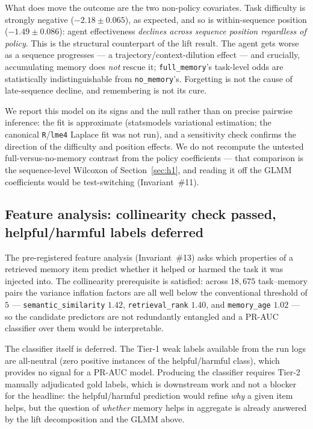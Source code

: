 What does move the outcome are the two non-policy covariates. Task difficulty is strongly
negative ($-2.18 \pm 0.065$), as expected, and so is within-sequence position
($-1.49 \pm 0.086$): agent effectiveness \emph{declines across sequence position regardless
of policy}. This is the structural counterpart of the lift result. The agent gets worse as a
sequence progresses --- a trajectory/context-dilution effect --- and crucially, accumulating
memory does \emph{not} rescue it; \texttt{full\_memory}'s task-level odds are statistically
indistinguishable from \texttt{no\_memory}'s. Forgetting is not the cause of late-sequence
decline, and remembering is not its cure.

We report this model on its signs and the null rather than on precise pairwise inference: the
fit is approximate (statsmodels variational estimation; the canonical \texttt{R}/\texttt{lme4}
Laplace fit was not run), and a sensitivity check confirms the direction of the difficulty and
position effects. We do not recompute the untested full-versus-no-memory contrast from the
policy coefficients --- that comparison is the sequence-level Wilcoxon of
Section~\ref{sec:h1}, and reading it off the GLMM coefficients would be test-switching
(Invariant~\#11).

\subsection{Feature analysis: collinearity check passed, helpful/harmful labels deferred}

The pre-registered feature analysis (Invariant~\#13) asks which properties of a retrieved
memory item predict whether it helped or harmed the task it was injected into. The
collinearity prerequisite is satisfied: across $18{,}675$ task--memory pairs the variance
inflation factors are all well below the conventional threshold of $5$ ---
\texttt{semantic\_similarity} $1.42$, \texttt{retrieval\_rank} $1.40$, and
\texttt{memory\_age} $1.02$ --- so the candidate predictors are not redundantly entangled and
a PR-AUC classifier over them would be interpretable.

The classifier itself is deferred. The Tier-1 weak labels available from the run logs are
all-neutral (zero positive instances of the helpful/harmful class), which provides no signal
for a PR-AUC model. Producing the classifier requires Tier-2 manually adjudicated gold
labels, which is downstream work and not a blocker for the headline: the helpful/harmful
prediction would refine \emph{why} a given item helps, but the question of \emph{whether}
memory helps in aggregate is already answered by the lift decomposition and the GLMM above.

